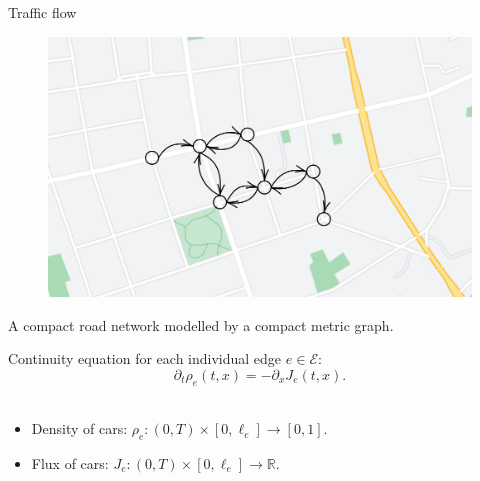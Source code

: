 \documentclass[9pt]{beamer}
\begin{document}
\begin{frame}{Traffic flow}
    \begin{figure}[H]
        \begin{center}
            \includegraphics[scale=0.15]{img/diagram-20220316.png}
        \end{center}
    \end{figure}
    \begin{center}
        \small{A compact road network modelled by a compact metric graph}.
    \end{center}
    Continuity equation for each individual edge $e \in \mathcal{E}$:
    \begin{equation*}
        \partial_t \rho_e  \left( t,x \right)  = - \partial_x J_e \left( t,x \right).
    \end{equation*} \\
    \begin{itemize}
        \item Density of cars: $\rho_e \colon  \left( 0, T \right)  \times \left[ 0, \ell_e \right] \to \left[0, 1\right]$.
        \item Flux of cars: $J_e \colon  \left( 0,T \right)  \times \left[ 0, \ell_e \right] \to \mathbb{R}$.
    \end{itemize}
\end{frame}
\end{document}
